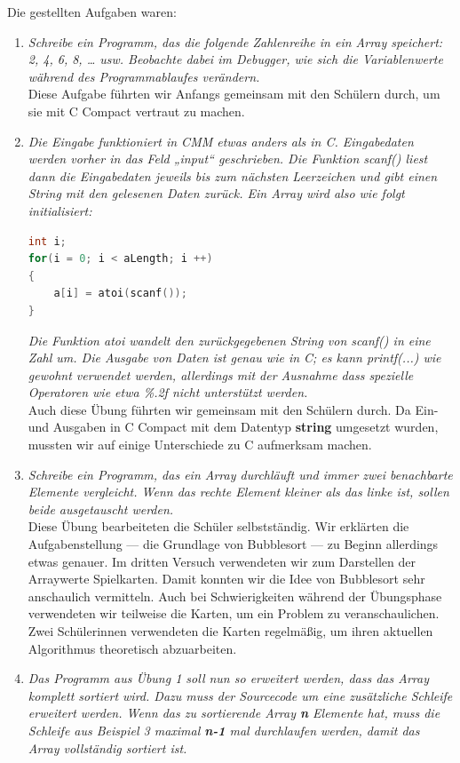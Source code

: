 Die gestellten Aufgaben waren:
\begin{enumerate}
\item \emph{Schreibe ein Programm, das die folgende Zahlenreihe in ein Array speichert: 2, 4, 6, 8, … usw. Beobachte dabei im Debugger, wie sich die Variablenwerte während des Programmablaufes verändern.}\\
Diese Aufgabe führten wir Anfangs gemeinsam mit den Schülern durch, um sie mit C Compact vertraut zu machen.

\item \emph{Die Eingabe funktioniert in CMM etwas anders als in C. Eingabedaten werden vorher in das Feld „input“ geschrieben. Die Funktion scanf() liest dann die Eingabedaten jeweils bis zum nächsten Leerzeichen und gibt einen String mit den gelesenen Daten zurück. Ein Array wird also wie folgt initialisiert:}
\begin{lstlisting}[language=C]
int i;
for(i = 0; i < aLength; i ++)
{
    a[i] = atoi(scanf());
}
\end{lstlisting}
\emph{Die Funktion atoi wandelt den zurückgegebenen String von scanf() in eine Zahl um.
Die Ausgabe von Daten ist genau wie in C; es kann printf(...) wie gewohnt verwendet werden, allerdings mit der Ausnahme dass spezielle Operatoren wie etwa \glqq{}\%.2f\grqq{} nicht unterstützt werden.}\\
Auch diese Übung führten wir gemeinsam mit den Schülern durch. Da Ein- und Ausgaben in C Compact mit dem Datentyp \textbf{string} umgesetzt wurden, mussten wir auf einige Unterschiede zu C aufmerksam machen.

\item \emph{Schreibe ein Programm, das ein Array durchläuft und immer zwei benachbarte Elemente vergleicht. Wenn das rechte Element kleiner als das linke ist, sollen beide ausgetauscht werden.}\\
Diese Übung bearbeiteten die Schüler selbstständig. Wir erklärten die Aufgabenstellung --- die Grundlage von Bubblesort --- zu Beginn allerdings etwas genauer. Im dritten Versuch verwendeten wir zum Darstellen der Arraywerte Spielkarten. Damit konnten wir die Idee von Bubblesort sehr anschaulich vermitteln. Auch bei Schwierigkeiten während der Übungsphase verwendeten wir teilweise die Karten, um ein Problem zu veranschaulichen. Zwei Schülerinnen verwendeten die Karten regelmäßig, um ihren aktuellen Algorithmus theoretisch abzuarbeiten.

\item \emph{Das Programm aus Übung 1 soll nun so erweitert werden, dass das Array komplett sortiert wird. Dazu muss der Sourcecode um eine zusätzliche Schleife erweitert werden. Wenn das zu sortierende Array \textbf{n} Elemente hat, muss die Schleife aus Beispiel 3 maximal \textbf{n-1} mal durchlaufen werden, damit das Array vollständig sortiert ist.}


\end{enumerate}
